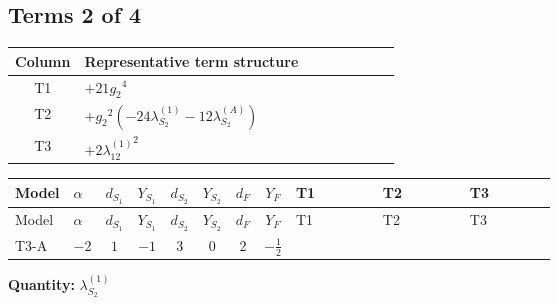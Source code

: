 \documentclass[8pt]{article}
\begin{document}
\begin{landscape}
\subsection*{Terms 2 of 4}
\begin{center}
\begin{tabular}{@{}c >{\raggedright\arraybackslash}p{0.82\linewidth}@{}}
\toprule
Column & Representative term structure \\
\midrule
T1 & \(\displaystyle +21 {g_2}^4\) \\
\midrule
T2 & \(\displaystyle +{g_2}^2 (-24 {\lambda_{S_2}^{(1)}}-12 {\lambda_{S_2}^{(A)}})\) \\
\midrule
T3 & \(\displaystyle +2 {\lambda_{12}^{(1)}}^2\) \\
\midrule
\bottomrule
\end{tabular}
\end{center}
\smallskip
\tiny
\begin{longtable}{@{}llcccccc >{\raggedright\arraybackslash}p{0.21\linewidth} >{\raggedright\arraybackslash}p{0.21\linewidth} >{\raggedright\arraybackslash}p{0.21\linewidth}@{}}
\toprule
Model & $\alpha$ & $d_{S_1}$ & $Y_{S_1}$ & $d_{S_2}$ & $Y_{S_2}$ & $d_F$ & $Y_F$ & T1 & T2 & T3 \\
\midrule
\endfirsthead
\toprule
Model & $\alpha$ & $d_{S_1}$ & $Y_{S_1}$ & $d_{S_2}$ & $Y_{S_2}$ & $d_F$ & $Y_F$ & T1 & T2 & T3 \\
\midrule
\endhead
T3-A & $-2$ & $1$ & $-1$ & $3$ & $0$ & $2$ & $-\frac{1}{2}$ & \scriptsize\adjustbox{max width=\linewidth}{$\begin{gathered} +21 {g_2}^4\end{gathered}$} & \scriptsize\adjustbox{max width=\linewidth}{$\begin{gathered} +{g_2}^2 (-24 {\lambda_{S_2}^{(1)}}-12 {\lambda_{S_2}^{(A)}})\end{gathered}$} & \scriptsize\adjustbox{max width=\linewidth}{$\begin{gathered} +2 {\lambda_{12}^{(1)}}^2\end{gathered}$} \\
\midrule
\bottomrule
\end{longtable}
\clearpage
\noindent\textbf{Quantity: }$\lambda_{S_2}^{(1)}$\par\smallskip

\end{landscape}
\end{document}
